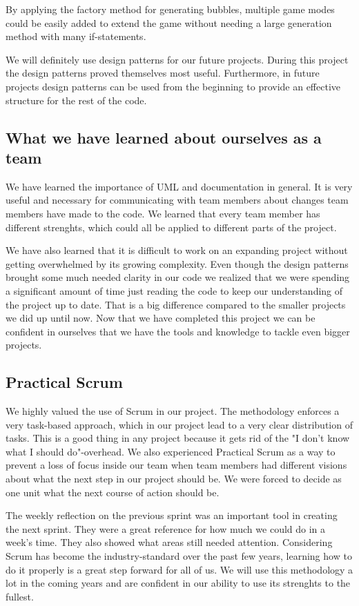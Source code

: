 \documentclass[a4paper]{article}
\begin{document}
By applying the factory method for generating bubbles, multiple game modes could be easily added to extend the game without needing a large generation method with many if-statements.

We will definitely use design patterns for our future projects. During this project the design patterns proved themselves most useful. Furthermore, in future projects design patterns can be used from the beginning to provide an effective structure for the rest of the code.

\subsection{What we have learned about ourselves as a team}
We have learned the importance of UML and documentation in general. It is very useful and necessary for communicating with team members about changes team members have made to the code. We learned that every team member has different strenghts, which could all be applied to different parts of the project. 

We have also learned that it is difficult to work on an expanding project without getting overwhelmed by its growing complexity. Even though the design patterns brought some much needed clarity in our code we realized that we were spending a significant amount of time just reading the code to keep our understanding of the project up to date. That is a big difference compared to the smaller projects we did up until now. Now that we have completed this project we can be confident in ourselves that we have the tools and knowledge to tackle even bigger projects.

\subsection{Practical Scrum}
We highly valued the use of Scrum in our project. The methodology enforces a very task-based approach, which in our project lead to a very clear distribution of tasks. This is a good thing in any project because it gets rid of the "I don't know what I should do"-overhead. We also experienced Practical Scrum as a way to prevent a loss of focus inside our team when team members had different visions about what the next step in our project should be. We were forced to decide as one unit what the next course of action should be.

The weekly reflection on the previous sprint was an important tool in creating the next sprint. They were a great reference for how much we could do in a week's time. They also showed what areas still needed attention. Considering Scrum has become the industry-standard over the past few years, learning how to do it properly is a great step forward for all of us. We will use this methodology a lot in the coming years and are confident in our ability to use its strenghts to the fullest.
\end{document}
